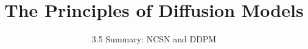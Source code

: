 
\title{The Principles of Diffusion Models}
\subtitle{3.5 Summary: NCSN and DDPM}


\begin{frame}
    \titlepage
\end{frame}


